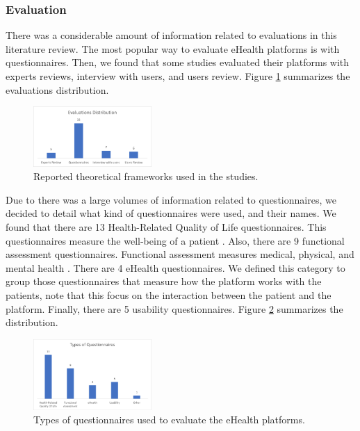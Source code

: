\documentclass[conference]{IEEEtran}
\begin{document}
\subsubsection{Evaluation}

There was a considerable amount of information related to evaluations in this literature review. The most popular way to evaluate eHealth platforms is with questionnaires. Then, we found that some studies evaluated their platforms with experts reviews, interview with users, and users review. Figure \ref{fig:evaluations} summarizes the evaluations distribution.

\begin{figure}[h]
    \centering
    \includegraphics[width=0.40\textwidth]{charts/evaluations.png}
    \caption{Reported theoretical frameworks used in the studies.}
    \label{fig:evaluations}
\end{figure}

Due to there was a large volumes of information related to questionnaires, we decided to detail what kind of questionnaires were used, and their names. We found that there are 13 Health-Related Quality of Life questionnaires. This questionnaires measure the well-being of a patient \cite{Nahler2009}. Also, there are 9 functional assessment questionnaires. Functional assessment measures medical, physical, and mental health \cite{Sisto2018}. There are 4 eHealth questionnaires. We defined this category to group those questionnaires that measure how the platform works with the patients, note that this focus on the interaction between the patient and the platform. Finally, there are 5 usability questionnaires. Figure \ref{fig:questionnaires_types} summarizes the distribution.

\begin{figure}[h]
    \centering
\includegraphics[width=0.40\textwidth]{charts/questionnaires_types.png}
    \caption{Types of questionnaires used to evaluate the eHealth platforms.}
    \label{fig:questionnaires_types}
\end{figure}
\end{document}
